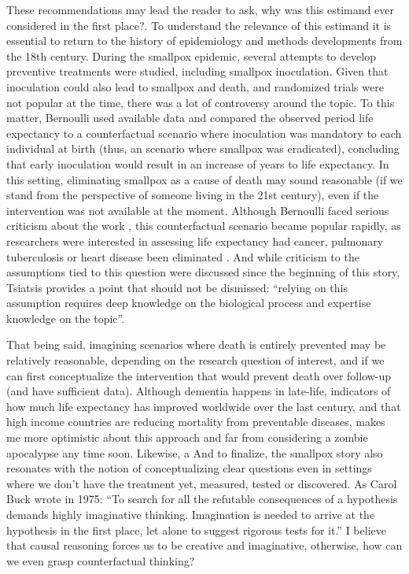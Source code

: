 \documentclass[
]{book}
\begin{document}
These recommendations may lead the reader to ask, why was this estimand ever considered in the first place?. To understand the relevance of this estimand it is essential to return to the history of epidemiology and methods developments from the 18th century. During the smallpox epidemic, several attempts to develop preventive treatments were studied, including smallpox inoculation. Given that inoculation could also lead to smallpox and death, and randomized trials were not popular at the time, there was a lot of controversy around the topic\autocite{karn1932}. To this matter, Bernoulli used available data and compared the observed period life expectancy to a counterfactual scenario where inoculation was mandatory to each individual at birth (thus, an scenario where smallpox was eradicated), concluding that early inoculation would result in an increase of years to life expectancy\autocite{karn1932,colombo2015}. In this setting, eliminating smallpox as a cause of death may sound reasonable (if we stand from the perspective of someone living in the 21st century), even if the intervention was not available at the moment. Although Bernoulli faced serious criticism about the work \autocite{seth2014,colombo2015}, this counterfactual scenario became popular rapidly, as researchers were interested in assessing life expectancy had cancer, pulmonary tuberculosis or heart disease been eliminated \autocite{karn1933}. And while criticism to the assumptions tied to this question were discussed since the beginning of this story, Tsiatsis provides a point that should not be dismissed: ``relying on this assumption requires deep knowledge on the biological process and expertise knowledge on the topic''\autocite{tsiatsis1975}.

That being said, imagining scenarios where death is entirely prevented may be relatively reasonable, depending on the research question of interest, and if we can first conceptualize the intervention that would prevent death over follow-up (and have sufficient data). Although dementia happens in late-life, indicators of how much life expectancy has improved worldwide over the last century, and that high income countries are reducing mortality from preventable diseases, makes me more optimistic about this approach and far from considering a zombie apocalypse any time soon. Likewise, a And to finalize, the smallpox story also resonates with the notion of conceptualizing clear questions even in settings where we don't have the treatment yet, measured, tested or discovered. As Carol Buck wrote in 1975: ``To search for all the refutable consequences of a hypothesis demands highly imaginative thinking. Imagination is needed to arrive at the hypothesis in the first place, let alone to suggest rigorous tests for it.'' I believe that causal reasoning forces us to be creative and imaginative, otherwise, how can we even grasp counterfactual thinking?
\end{document}
